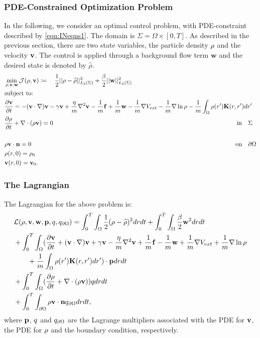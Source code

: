 
\subsubsection{PDE-Constrained Optimization Problem}
In the following, we consider an optimal control problem, with PDE-constraint described by \eqref{eqn:INeqns1}. 
The domain is $\Sigma=\Omega \times [0,T]$. As described in the previous section, there are two state variables, the particle density $\rho$ and the velocity $\mathbf{v}$. The control is applied through a background flow term $\mathbf{w}$ and the desired state is denoted by $\widehat \rho$. 
\begin{align*}
&\min_{\rho,\mathbf{v},\mathbf{w} } \mathcal J(\rho,\mathbf{v}) \coloneqq \quad \frac{1}{2}||\rho - \widehat {\rho}||_{L_2(\Sigma)}^2  +\frac{\beta}{2}||\mathbf{w}||_{L_2(\Sigma)}^2\\
&\text{subject to:}\\
& \frac{\partial \mathbf{v}}{\partial t}= -  (\mathbf{v} \cdot \nabla)\mathbf{v} - \gamma  \mathbf{v} + \frac{\eta}{m} \nabla^2 \mathbf{v}  -\frac{1}{m}\mathbf{f} +\frac{1}{m}\mathbf{w} -\frac{1}{m} \nabla V_{ext} - \frac{1}{m}\nabla \ln \rho  -\frac{1}{m}\int_\Omega \rho(r') \mathbf{K}(r,r')dr' \\
&\frac{\partial \rho}{\partial t} + \nabla \cdot (\rho \mathbf{v})=0 \qquad\qquad \qquad\qquad\qquad\quad \quad\quad\qquad \qquad\qquad \qquad\qquad\qquad\quad \qquad\quad\ \ \text{in} \quad \Sigma\\
\\
&\rho \mathbf{v} \cdot \mathbf{n} =0\qquad\qquad \qquad\qquad\qquad\qquad\qquad\qquad\qquad \qquad\qquad \qquad\qquad\qquad \qquad\qquad\quad  \text{on} \quad \partial  \Omega\\
& \rho(r,0)=\rho_0\\
& \mathbf{v}(r,0)=\mathbf{v}_0.
\end{align*}

\subsubsection*{The Lagrangian}
The Lagrangian for the above problem is:
\begin{align*}
&\mathcal{L}(\rho,\mathbf{v},\mathbf{w},\mathbf{p},q,{q}_{\partial \Omega}) = \int_0^T \int_\Omega  \frac{1}{2}(\rho - \widehat {\rho})^2 drdt  +\int_0^T \int_\Omega  \frac{\beta}{2}\mathbf{w}^2 drdt\\
&+ \int_0^T \int_\Omega (\frac{\partial \mathbf{v}}{\partial t}+  (\mathbf{v} \cdot \nabla)\mathbf{v} + \gamma  \mathbf{v} - \frac{\eta}{m} \nabla^2 \mathbf{v}  +\frac{1}{m}\mathbf{f} -\frac{1}{m}\mathbf{w} +\frac{1}{m} \nabla V_{ext} + \frac{1}{m}\nabla \ln \rho  \\
&\quad \quad +\frac{1}{m}\int_\Omega \rho(r') \mathbf{K}(r,r')dr') \cdot \mathbf{p} dr dt\\
& + \int_0^T \int_\Omega (\frac{\partial \rho}{\partial t} + \nabla \cdot (\rho \mathbf{v})) q dr dt\\ 
& +\int_0^T \int_{\partial\Omega} \rho \mathbf{v} \cdot \mathbf{n} {q}_{\partial \Omega} dr dt,
\end{align*}
where $\mathbf{p}$, $q$ and ${q}_{\partial \Omega}$ are the Lagrange multipliers associated with the PDE for $\mathbf{v}$, the PDE for $\rho$ and the boundary condition, respectively.


